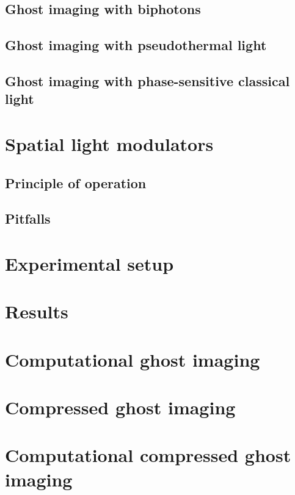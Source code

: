 \documentclass{report}
\begin{document}
\subsection{Ghost imaging with biphotons}

\subsection{Ghost imaging with pseudothermal light}

\subsection{Ghost imaging with phase-sensitive classical light}

\section{Spatial light modulators}

\subsection{Principle of operation}

\subsection{Pitfalls}

\section{Experimental setup}

\section{Results}

\section{Computational ghost imaging}

\section{Compressed ghost imaging}

\section{Computational compressed ghost imaging}
\end{document}
